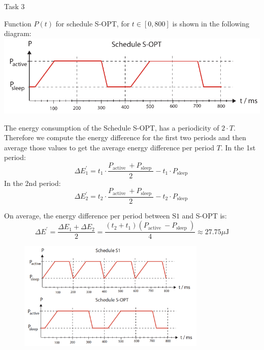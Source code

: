 \begin{frame}[allowframebreaks]{Task 3}{}
  \begin{solutionnoinc}
    Function $P(t)$ for schedule S-OPT, for $t \in[0,800]$ is shown in the following diagram:
    \includegraphics[width=\textwidth]{./figures/task3_3.png}
  \end{solutionnoinc}
  \begin{solutionnoinc}
    The energy consumption of the Schedule S-OPT, has a periodicity of $2 \cdot T$. Therefore we compute the energy difference for the first two periods and then average those values to get the average energy difference per period $T$. In the 1st period:
    \[
    \Delta E_1^{\prime}=t_1 \cdot \frac{P_{\text {active }}+P_{\text {sleep }}}{2}-t_1 \cdot P_{\text {sleep }}
    \]
    In the 2nd period:
    \[
    \Delta E_2^{\prime}=t_2 \cdot \frac{P_{\text {active }}+P_{\text {sleep }}}{2}-t_2 \cdot P_{\text {sleep }}
    \]
  \end{solutionnoinc}
  \begin{solution}
    On average, the energy difference per period between $\mathrm{S} 1$ and S-OPT is:
    \[
    \Delta E^{\prime}=\frac{\Delta E_1+\Delta E_2}{2}=\frac{\left(t_2+t_1\right)\left(P_{\text {active }}-P_{\text {sleep }}\right)}{4} \approx 27.75 \mu \mathrm{J}
    \]
  \end{solution}
  \begin{figure}
    \centering
    \includegraphics[width=0.8\textwidth]{./figures/3_overview_2.png}
  \end{figure}
\end{frame}
